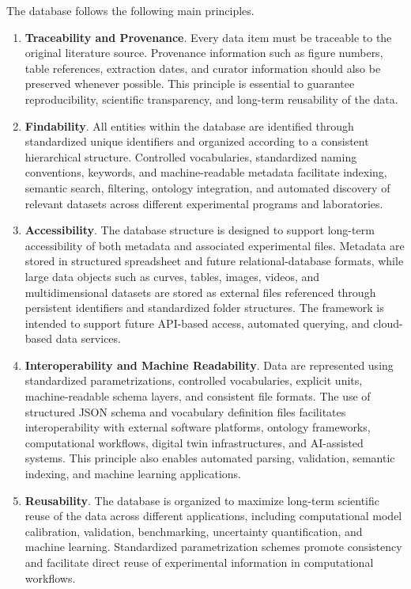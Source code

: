 \documentclass[11pt]{book}
\begin{document}
\vspace{5mm}
The database follows the following main principles.

\begin{enumerate}
    \item {\textbf{Traceability and Provenance}}. Every data item must be traceable to the original literature source. Provenance information such as figure numbers, table references, extraction dates, and curator information should also be preserved whenever possible. This principle is essential to guarantee reproducibility, scientific transparency, and long-term reusability of the data.

    \item {\textbf{Findability}}. All entities within the database are identified through standardized unique identifiers and organized according to a consistent hierarchical structure. Controlled vocabularies, standardized naming conventions, keywords, and machine-readable metadata facilitate indexing, semantic search, filtering, ontology integration, and automated discovery of relevant datasets across different experimental programs and laboratories.

    \item {\textbf{Accessibility}}. The database structure is designed to support long-term accessibility of both metadata and associated experimental files. Metadata are stored in structured spreadsheet and future relational-database formats, while large data objects such as curves, tables, images, videos, and multidimensional datasets are stored as external files referenced through persistent identifiers and standardized folder structures. The framework is intended to support future API-based access, automated querying, and cloud-based data services.

    \item {\textbf{Interoperability and Machine Readability}}. Data are represented using standardized parametrizations, controlled vocabularies, explicit units, machine-readable schema layers, and consistent file formats. The use of structured JSON schema and vocabulary definition files facilitates interoperability with external software platforms, ontology frameworks, computational workflows, digital twin infrastructures, and AI-assisted systems. This principle also enables automated parsing, validation, semantic indexing, and machine learning applications.

    \item {\textbf{Reusability}}. The database is organized to maximize long-term scientific reuse of the data across different applications, including computational model calibration, validation, benchmarking, uncertainty quantification, and machine learning. Standardized parametrization schemes promote consistency and facilitate direct reuse of experimental information in computational workflows.


\end{enumerate}
\end{document}
